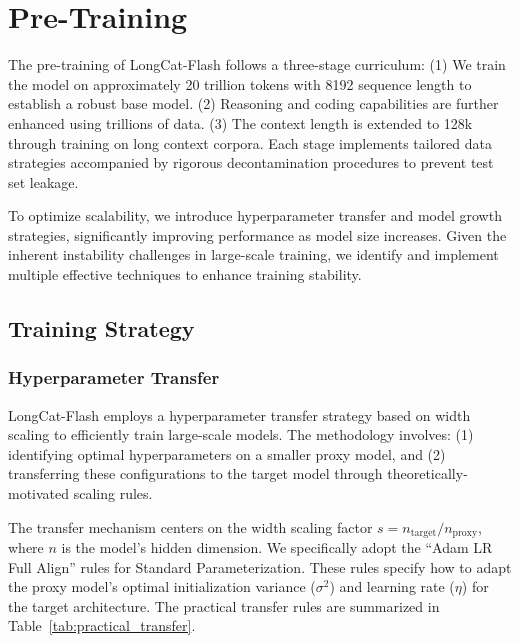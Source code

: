 \documentclass{article}
\newcommand{\longcat}{LongCat-Flash\xspace}
\begin{document}
\section{Pre-Training}

The pre-training of \longcat follows a three-stage curriculum: (1) We train the model on approximately 20 trillion tokens with 8192 sequence length to establish a robust base model. (2) Reasoning and coding capabilities are further enhanced using trillions of data. (3) The context length is extended to 128k through training on long context corpora. Each stage implements tailored data strategies accompanied by rigorous decontamination procedures to prevent test set leakage.

To optimize scalability, we introduce hyperparameter transfer and model growth strategies, significantly improving performance as model size increases. Given the inherent instability challenges in large-scale training, we identify and implement multiple effective techniques to enhance training stability.

\subsection{Training Strategy}

\subsubsection{Hyperparameter Transfer}
\longcat employs a hyperparameter transfer strategy based on width scaling \citep{everett2024scaling} to efficiently train large-scale models. The methodology involves: (1) identifying optimal hyperparameters on a smaller proxy model, and (2) transferring these configurations to the target model through theoretically-motivated scaling rules.

The transfer mechanism centers on the width scaling factor $s = n_{\text{target}} / n_{\text{proxy}}$, where $n$ is the model's hidden dimension. We specifically adopt the ``Adam LR Full Align'' rules for Standard Parameterization. These rules specify how to adapt the proxy model's optimal initialization variance ($\sigma^2$) and learning rate ($\eta$) for the target architecture. The practical transfer rules are summarized in Table~\ref{tab:practical_transfer}. 
\end{document}
